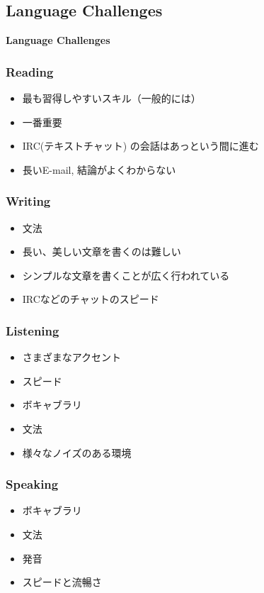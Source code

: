 \documentclass[aspectratio=169,11pt,hyperref={colorlinks=true}]{beamer}
\begin{document}
\subsection{Language Challenges}
\begin{frame}
  \bf\Huge{Language Challenges}
\end{frame}

\begin{frame}
\frametitle{Reading}
  \begin{itemize}
  \item 最も習得しやすいスキル（一般的には）
  \item 一番重要
  \item IRC(テキストチャット) の会話はあっという間に進む
  \item 長いE-mail, 結論がよくわからない
  \end{itemize}
\end{frame}

\begin{frame}
\frametitle{Writing}
  \begin{itemize}
  \item 文法
  \item 長い、美しい文章を書くのは難しい
  \item シンプルな文章を書くことが広く行われている
  \item IRCなどのチャットのスピード
  \end{itemize}
\end{frame}

\begin{frame}
\frametitle{Listening}
  \begin{itemize}
  \item さまざまなアクセント
  \item スピード
  \item ボキャブラリ
  \item 文法
  \item 様々なノイズのある環境
  \end{itemize}
\end{frame}

\begin{frame}
\frametitle{Speaking}
  \begin{itemize}
  \item ボキャブラリ
  \item 文法
  \item 発音
  \item スピードと流暢さ
  \end{itemize}
\end{frame}
\end{document}
